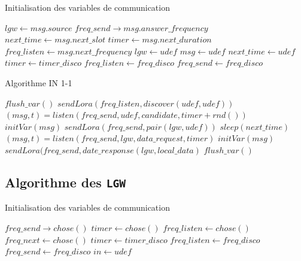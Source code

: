 \begin{algorithm}
\caption{Initialisation des variables de communication}\label{alg:intvar}
\begin{algorithmic}[1]
\State $lgw \leftarrow msg.source$
\State $freq\_send \rightarrow msg.answer\_frequency$
\State $next\_time \leftarrow msg.next\_slot$
\State $timer \leftarrow msg.next\_duration$
\State $freq\_listen \leftarrow msg.next\_frequency$
\EndProcedure
\State
{}
\State $lgw \leftarrow udef$
\State $msg \leftarrow udef$
\State $next\_time \leftarrow udef$
\State $timer \leftarrow timer\_disco$
\State $freq\_listen \leftarrow freq\_disco$
\State $freq\_send \leftarrow freq\_disco$
\EndProcedure
\end{algorithmic}
\end{algorithm}


\begin{algorithm}
\caption{Algorithme IN 1-1}\label{alg:in1-1}
\begin{algorithmic}[1]
  \State $flush\_var()$
  \State {}
    \State $sendLora(freq\_listen,discover(udef,udef))$
    \State $(msg,t) = listen(freq\_send,udef,candidate,timer + rnd())$
  \EndWhile
  \State $initVar(msg)$
  \State $sendLora(freq\_send,pair(lgw,udef))$
  \State
  \State {}
    \State $sleep(next\_time)$
    \State $(msg,t) = listen(freq\_send,lgw,data\_request,timer)$
      \State $initVar(msg)$
      \State $sendLora(freq\_send,date\_response(lgw,local\_data)$
    \Else
      $flush\_var()$
    \EndIf
  \EndWhile
\EndWhile
\end{algorithmic}
\end{algorithm}

\subsection{Algorithme des \texttt{LGW}}

\begin{algorithm}
\caption{Initialisation des variables de communication}\label{alg:initvarlg}
\begin{algorithmic}[1]
\State $freq\_send \rightarrow chose()$
\State $timer \leftarrow chose()$
\State $freq\_listen \leftarrow chose()$
\State $freq\_next \leftarrow chose()$
\EndProcedure
\State
{}
\State $timer \leftarrow timer\_disco$
\State $freq\_listen \leftarrow freq\_disco$
\State $freq\_send \leftarrow freq\_disco$
\State $in \leftarrow udef$
\EndProcedure
\end{algorithmic}
\end{algorithm}

